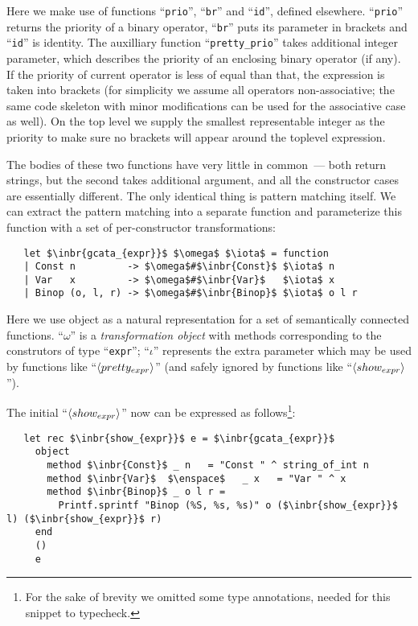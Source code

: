 Here we make use of functions ``\lstinline{prio}'', ``\lstinline{br}'' and ``\lstinline{id}'', defined elsewhere. ``\lstinline{prio}''
returns the priority of a binary operator, ``\lstinline{br}'' puts its parameter in brackets and ``\lstinline{id}''
is identity. The auxilliary function ``\lstinline{pretty_prio}'' takes additional integer parameter, which describes the priority of an enclosing
binary operator (if any). If the priority of current operator is less of equal than that, the expression is taken into brackets (for simplicity we assume all
operators non-associative; the same code skeleton with minor modifications can be used for the associative case as well). On the top level we supply the
smallest representable integer as the priority to make sure no brackets will appear around the toplevel expression.

The bodies of these two functions have very little in common~--- both return strings, but the second takes additional argument, and all the constructor cases
are essentially different. The only identical thing is pattern matching itself. We can extract the pattern matching into a separate function and parameterize this
function with a set of per-constructor transformations:

\begin{lstlisting}
   let $\inbr{gcata_{expr}}$ $\omega$ $\iota$ = function
   | Const n         -> $\omega$#$\inbr{Const}$ $\iota$ n
   | Var   x         -> $\omega$#$\inbr{Var}$   $\iota$ x
   | Binop (o, l, r) -> $\omega$#$\inbr{Binop}$ $\iota$ o l r
\end{lstlisting}

Here we use object as a natural representation for a set of semantically connected functions. ``$\omega$'' is a \emph{transformation object} with methods corresponding to
the construtors of type ``\lstinline{expr}''; ``$\iota$'' represents the extra parameter which may be used by functions like ``$\left<pretty_{expr}\right>$'' (and safely
ignored by functions like ``$\left<show_{expr}\right>$'').

The initial ``$\left<show_{expr}\right>$'' now can be expressed as follows\footnote{For the sake of brevity we omitted some type annotations, needed for this snippet to typecheck.}:

\begin{lstlisting}
   let rec $\inbr{show_{expr}}$ e = $\inbr{gcata_{expr}}$
     object
       method $\inbr{Const}$ _ n   = "Const " ^ string_of_int n
       method $\inbr{Var}$  $\enspace$   _ x   = "Var " ^ x
       method $\inbr{Binop}$ _ o l r =
         Printf.sprintf "Binop (%S, %s, %s)" o ($\inbr{show_{expr}}$ l) ($\inbr{show_{expr}}$ r)
     end
     ()
     e
\end{lstlisting}

